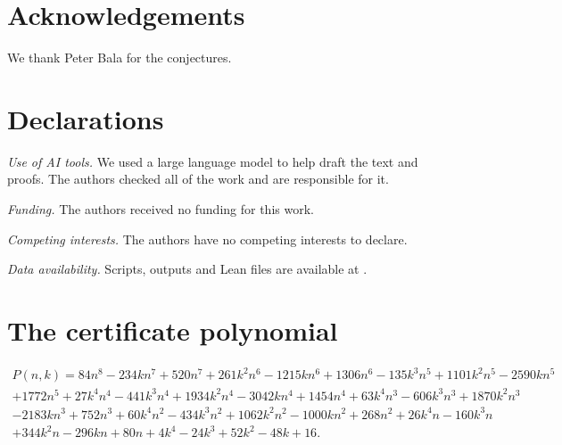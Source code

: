 \documentclass[11pt]{amsart}
\begin{document}
\section*{Acknowledgements}
We thank Peter Bala for the conjectures.

\section*{Declarations}
\emph{Use of AI tools.} We used a large language model to help draft the text and proofs. The authors checked all of the work and are responsible for it.

\emph{Funding.} The authors received no funding for this work.

\emph{Competing interests.} The authors have no competing interests to declare.

\emph{Data availability.} Scripts, outputs and Lean files are available at \cite{repo}.

\appendix
\section{The certificate polynomial}\label{app:cert}
\begin{multline*}
P(n,k)=84n^8-234kn^7+520n^7+261k^2n^6-1215kn^6+1306n^6-135k^3n^5+1101k^2n^5-2590kn^5\\
+1772n^5+27k^4n^4-441k^3n^4+1934k^2n^4-3042kn^4+1454n^4+63k^4n^3-606k^3n^3+1870k^2n^3\\
-2183kn^3+752n^3+60k^4n^2-434k^3n^2+1062k^2n^2-1000kn^2+268n^2+26k^4n-160k^3n\\
+344k^2n-296kn+80n+4k^4-24k^3+52k^2-48k+16.
\end{multline*}



\end{document}
